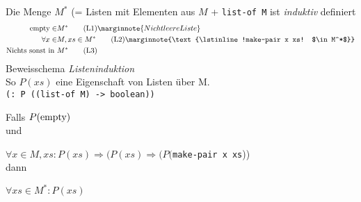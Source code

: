 Die Menge $M^*$ (= Listen mit Elementen aus $M$ + \lstinline|list-of M| ist \emph{induktiv} definiert\\
\begin{align}
\text{\lstinline!empty!} \in& M^* \tag{L1} \marginnote{Nicht leere Liste}\\
\forall x \in& M , xs \in M^* \tag{L2} \marginnote{\text{\lstinline!make-pair x xs! $\in M^*$}} \\
\t{Nichts sonst in }& M^* \tag{L3}
\end{align}
Beweisschema \emph{Listeninduktion}\\
So $P(xs)$ eine Eigenschaft von Listen über M.\\
\lstinline|(: P ((list-of M) -> boolean))|\\
\begin{mdframed}
	Falls $P(\text{\lstinline|empty|})$ \\
	und \par$\forall x \in M, xs : P(xs) \Rightarrow (P(xs) \Rightarrow (P($\lstinline|make-pair x xs|))\\
	dann \par $\forall xs \in M^* : P(xs)$ 
\end{mdframed}